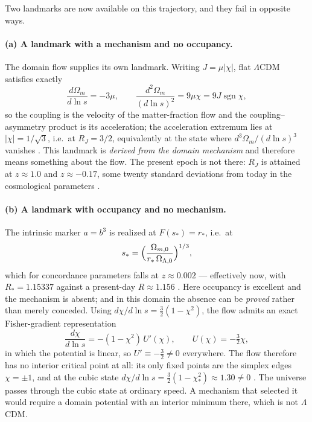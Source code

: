 \documentclass[11pt,a4paper]{article}
\theoremstyle{definition}
\theoremstyle{plain}
\theoremstyle{remark}
\begin{document}
Two landmarks are now available on this trajectory, and they fail in opposite
ways.

\paragraph{(a) A landmark with a mechanism and no occupancy.}
The domain flow supplies its own landmark. Writing $J=\mu|\chi|$, flat
$\Lambda$CDM satisfies exactly
\begin{equation}
\frac{d\Omega_{m}}{d\ln s}=-3\mu,
\qquad
\frac{d^{2}\Omega_{m}}{(d\ln s)^{2}}=9\mu\chi=9J\operatorname{sgn}\chi ,
\label{eq:flowid}
\end{equation}
so the coupling is the velocity of the matter-fraction flow and the
coupling--asymmetry product is its acceleration; the acceleration extremum lies
at $|\chi|=1/\sqrt3$, i.e.\ at $R_{J}=3/2$, equivalently at the state where
$d^{3}\Omega_{m}/(d\ln s)^{3}$ vanishes \cite{PartitionFlow}. This landmark is
\emph{derived from the domain mechanism} and therefore means something about the
flow. The present epoch is not there: $R_{J}$ is attained at $z\approx 1.0$ and
$z\approx -0.17$, some twenty standard deviations from today in the
cosmological parameters \cite{PartitionFlow,Planck18}.

\paragraph{(b) A landmark with occupancy and no mechanism.}
The intrinsic marker $a=b^{3}$ is realized at $F(s_{*})=r_{*}$, i.e.\ at
\begin{equation}
s_{*}=\Bigl(\frac{\Omega_{m,0}}{r_{*}\,\Omega_{\Lambda,0}}\Bigr)^{1/3} ,
\end{equation}
which for concordance parameters falls at $z\approx 0.002$ --- effectively now,
with $R_{*}=1.15337$ against a present-day $R\approx 1.156$
\cite{PartitionFlow,Planck18}. Here occupancy is excellent and the mechanism is
absent; and in this domain the absence can be \emph{proved} rather than merely
conceded. Using $d\chi/d\ln s=\tfrac32(1-\chi^{2})$, the flow admits an exact
Fisher-gradient representation
\begin{equation}
\frac{d\chi}{d\ln s}=-(1-\chi^{2})\,U'(\chi),
\qquad
U(\chi)=-\tfrac{3}{2}\chi ,
\label{eq:linearU}
\end{equation}
in which the potential is linear, so $U'\equiv-\tfrac32\neq 0$ everywhere. The
flow therefore has no interior critical point at all: its only fixed points are
the simplex edges $\chi=\pm1$, and at the cubic state
$d\chi/d\ln s=\tfrac32(1-\chi_{*}^{2})\approx 1.30\neq 0$ \cite{PartitionFlow}.
The universe passes through the cubic state at ordinary speed. A mechanism that
selected it would require a domain potential with an interior minimum there,
which is not $\Lambda$CDM.
\end{document}
